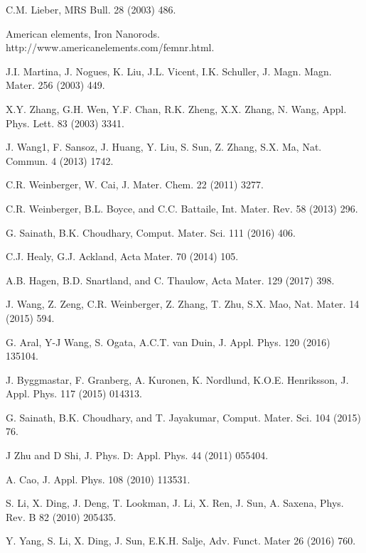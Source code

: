 \documentclass[%
reprint,%
 amssymb, amsmath,%
 aip,apl,%
]{revtex4-1}
\begin{document}
\begin{thebibliography}{99}


 C.M. Lieber, MRS Bull. 28 (2003) 486.

 American elements, Iron Nanorods. http://www.americanelements.com/femnr.html.

 J.I. Martina, J. Nogues, K. Liu, J.L. Vicent, I.K. Schuller, J. Magn. Magn. Mater. 256 (2003) 449.

 X.Y. Zhang, G.H. Wen, Y.F. Chan, R.K. Zheng, X.X. Zhang, N. Wang, Appl. Phys. Lett. 83 (2003) 3341.

 J. Wang1, F. Sansoz, J. Huang, Y. Liu, S. Sun, Z. Zhang, S.X. Ma, Nat. Commun. 4 (2013) 1742. 

 C.R. Weinberger, W. Cai, J. Mater. Chem. 22 (2011) 3277.

 C.R. Weinberger, B.L. Boyce, and C.C. Battaile, Int. Mater. Rev. 58 (2013) 296.

 G. Sainath, B.K. Choudhary, Comput. Mater. Sci. 111 (2016) 406.

 C.J. Healy, G.J. Ackland, Acta Mater. 70 (2014) 105.

 A.B. Hagen, B.D. Snartland, and C. Thaulow, Acta Mater. 129 (2017) 398.

 J. Wang, Z. Zeng, C.R. Weinberger, Z. Zhang, T. Zhu, S.X. Mao, Nat. Mater. 14 (2015) 594.

 G. Aral, Y-J Wang, S. Ogata, A.C.T. van Duin, J. Appl. Phys. 120 (2016) 135104.

 J. Byggmastar, F. Granberg, A. Kuronen, K. Nordlund, K.O.E. Henriksson, J. Appl. Phys. 117 (2015) 014313.

 G. Sainath, B.K. Choudhary, and T. Jayakumar, Comput. Mater. Sci. 104 (2015) 76.

 J Zhu and D Shi, J. Phys. D: Appl. Phys. 44 (2011) 055404.

 A. Cao, J. Appl. Phys. 108 (2010) 113531.

 S. Li, X. Ding, J. Deng, T. Lookman, J. Li, X. Ren, J. Sun, A. Saxena, Phys. Rev. B 82 (2010) 205435.

 Y. Yang, S. Li, X. Ding, J. Sun, E.K.H. Salje, Adv. Funct. Mater 26 (2016) 760.


\end{thebibliography}
\end{document}
